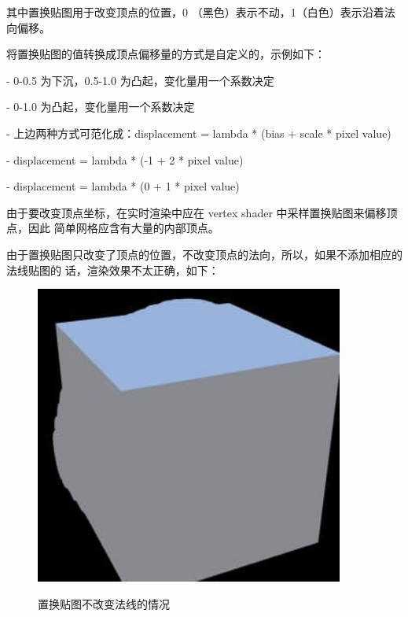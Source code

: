 \documentclass{article}
\begin{document}
	其中置换贴图用于改变顶点的位置，0 （黑色）表示不动，1（白色）表示沿着法向偏移。
	
	将置换贴图的值转换成顶点偏移量的方式是自定义的，示例如下：
	
	- 0-0.5 为下沉，0.5-1.0 为凸起，变化量用一个系数决定
	
	- 0-1.0 为凸起，变化量用一个系数决定
	
	- 上边两种方式可范化成：displacement = lambda * (bias + scale * pixel value)
	
	- displacement = lambda * (-1 + 2 * pixel value)
	
	- displacement = lambda * (0 + 1 * pixel value)
	
	由于要改变顶点坐标，在实时渲染中应在 vertex shader 中采样置换贴图来偏移顶点，因此
	简单网格应含有大量的内部顶点。
	
	由于置换贴图只改变了顶点的位置，不改变顶点的法向，所以，如果不添加相应的法线贴图的
	话，渲染效果不太正确，如下：
	\begin{figure}[htb]
		\caption{\label{table.label} 置换贴图不改变法线的情况} \centering
		\begin{center}
			\includegraphics[width=4in]{displacement_map_error.jpg}
			\label{figure.label}
		\end{center}
	\end{figure}
\end{document}
